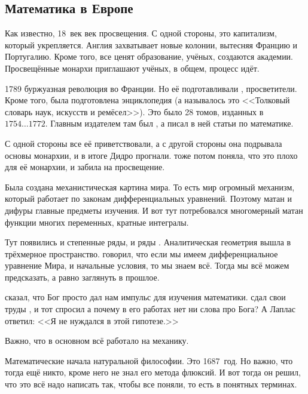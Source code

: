 \documentclass[a4paper,oneside,fleqn,10pt]{article}
\newcommand{\pe}[2]{${#1}\ldots{#2}$}
\begin{document}
\subsection{Математика в Европе}

Как известно, 18~век век просвещения. С одной стороны, это капитализм,
который укрепляется.  Англия захватывает новые колонии, вытесняя
Францию и Португалию. Кроме того, все ценят образование, учёных,
создаются академии. Просвещённые монархи приглашают учёных, в общем,
процесс идёт.

1789 буржуазная революция во Франции. Но её подготавливали
,  просветители.  Кроме того, была
подготовлена энциклопедия (а называлось это <<Толковый словарь наук,
искусств и ремёсел>>).  Это было 28 томов, изданных в
\pe{1754}{1772}. Главным издателем там был , а
 писал в ней статьи по математике.

С одной стороны все её приветствовали, а с другой стороны она
подрывала основы монархии, и в итоге Дидро прогнали.  тоже потом поняла, что это плохо для её
монархии, и забила на просвещение.

Была создана механистическая картина мира. То есть мир огромный
механизм, который работает по законам дифференциальных
уравнений. Поэтому матан и дифуры главные предметы изучения.  И вот
тут потребовался многомерный матан функции многих переменных, кратные
интегралы.

Тут появились и степенные ряды, и ряды . Аналитическая
геометрия вышла в трёхмерное пространство.   говорил, что
если мы имеем дифференциальное уравнение Мира, и начальные условия, то
мы знаем всё.  Тогда мы всё можем предсказать, а равно заглянуть в
прошлое.  

 сказал, что Бог просто дал нам импульс для изучения
математики.   сдал свои труды
, и тот спросил а почему в его работах нет
ни слова про Бога?  А Лаплас ответил: <<Я не нуждался в этой
гипотезе.>>

Важно, что в основном всё работало на механику.

 Математические начала натуральной философии. Это
1687~год.  Но важно, что тогда ещё никто, кроме него не знал его
метода флюксий.  И вот тогда он решил, что это всё надо написать так,
чтобы все поняли, то есть в понятных терминах.
\end{document}
